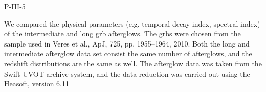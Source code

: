 P-III-5


\bigskip



\bigskip

\noindent We compared the physical parameters (e.g. temporal decay index, spectral index) of the intermediate and long grb afterglows. 
The grbs were chosen from the sample used in Veres et al., ApJ, 725, pp. 1955–1964, 2010.
Both the long and intermediate afterglow data set consist the same number of afterglows,
and the redshift distributions are the same as well.
The afterglow data was taken from the Swift UVOT archive system, and the
data reduction was carried out using the Heasoft, version 6.11

